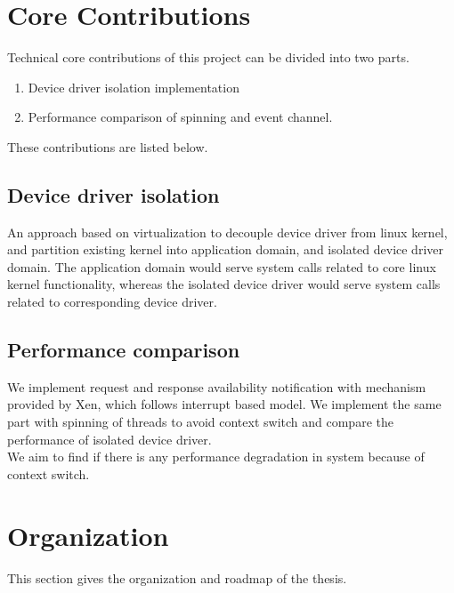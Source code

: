 \pagebreak

\section{Core Contributions}

Technical core contributions of this project can be divided into two parts. 

\begin{enumerate}
\item Device driver isolation implementation 
\item Performance comparison of spinning and event channel.
\end{enumerate}

These contributions are listed below. 

\subsection{Device driver isolation}

An approach based on virtualization to decouple device driver from linux kernel, and partition existing kernel into application domain, and isolated device driver domain. The application domain would serve system calls related to core linux kernel functionality, whereas the isolated device driver would serve system calls related to corresponding device driver.

\subsection{Performance comparison}

We implement request and response availability notification with mechanism provided by Xen, which follows interrupt based model. We implement the same part with spinning of threads to avoid context switch and compare the performance of isolated device driver.
\\
We aim to find if there is any performance degradation in system because of context switch.

\pagebreak
\section {Organization}

This section gives the organization and roadmap of the thesis.

